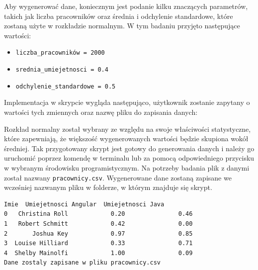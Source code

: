     
    
    \par Aby wygenerować dane, koniecznym jest podanie kilku znaczących parametrów, takich jak liczba pracowników oraz średnia i odchylenie standardowe, które zostaną użyte w rozkładzie normalnym. W tym badaniu przyjęto następujące wartości:
    
    \begin{itemize}
        \item \verb|liczba_pracowników = 2000|
        \item \verb|srednia_umiejetnosci = 0.4|
        \item \verb|odchylenie_standardowe = 0.5|
    \end{itemize}
    
    Implementacja w skrypcie wygląda następująco, użytkownik zostanie zapytany o wartości tych zmiennych oraz nazwę pliku do zapisania danych:
    
    
    
    \par Rozkład normalny został wybrany ze względu na swoje właściwości statystyczne, które zapewniają, że większość wygenerowanych wartości będzie skupiona wokół średniej. Tak przygotowany skrypt jest gotowy do generowania danych i należy go uruchomić poprzez komendę w terminalu lub za pomocą odpowiedniego przycisku w wybranym środowisku programistycznym. Na potrzeby badania plik z danymi został nazwany \verb|pracownicy.csv|. Wygenerowane dane zostaną zapisane we wcześniej nazwanym pliku w folderze, w którym znajduje się skrypt.
    
    


\begin{lstlisting}[language=bash, caption=Terminal po zakończeniu skryptu\\ Źródło:\textit{ opracowanie własne}]
        Imie  Umiejetnosci Angular  Umiejetnosci Java
0   Christina Roll            0.20               0.46
1   Robert Schmitt            0.42               0.00
2       Joshua Key            0.97               0.85
3  Louise Hilliard            0.33               0.71
4  Shelby Mainolfi            1.00               0.09
Dane zostaly zapisane w pliku pracownicy.csv
\end{lstlisting}
    
